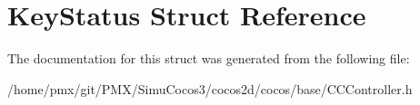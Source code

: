 \hypertarget{structKeyStatus}{}\section{Key\+Status Struct Reference}
\label{structKeyStatus}


The documentation for this struct was generated from the following file\+:\begin{DoxyCompactItemize}
\item 
/home/pmx/git/\+P\+M\+X/\+Simu\+Cocos3/cocos2d/cocos/base/C\+C\+Controller.\+h\end{DoxyCompactItemize}
